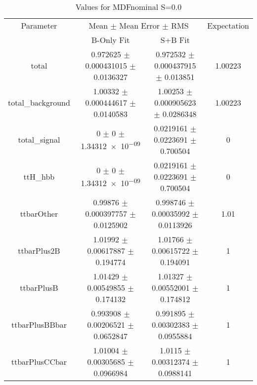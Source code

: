 \begin{table}
\centering
\caption{Values for MDFnominal S=0.0}
\begin{tabular}{cccc}
\toprule
Parameter & \multicolumn{2}{c}{Mean $\pm$ Mean Error $\pm$ RMS} & Expectation\\
 & B-Only Fit & S+B Fit & \\
\midrule
total & \num{0.972625} $\pm$ \num{0.000431015} $\pm$ \num{0.0136327} & \num{0.972532} $\pm$ \num{0.000437915} $\pm$ \num{0.013851} & \num{1.00223}\\
total\_background & \num{1.00332} $\pm$ \num{0.000444617} $\pm$ \num{0.0140583} & \num{1.00253} $\pm$ \num{0.000905623} $\pm$ \num{0.0286348} & \num{1.00223}\\
total\_signal & \num{0} $\pm$ \num{0} $\pm$ \num{1.34312e-09} & \num{0.0219161} $\pm$ \num{0.0223691} $\pm$ \num{0.700504} & \num{0}\\
ttH\_hbb & \num{0} $\pm$ \num{0} $\pm$ \num{1.34312e-09} & \num{0.0219161} $\pm$ \num{0.0223691} $\pm$ \num{0.700504} & \num{0}\\
ttbarOther & \num{0.99876} $\pm$ \num{0.000397757} $\pm$ \num{0.0125902} & \num{0.998746} $\pm$ \num{0.00035992} $\pm$ \num{0.0113926} & \num{1.01}\\
ttbarPlus2B & \num{1.01992} $\pm$ \num{0.00617887} $\pm$ \num{0.194774} & \num{1.01766} $\pm$ \num{0.00615722} $\pm$ \num{0.194091} & \num{1}\\
ttbarPlusB & \num{1.01429} $\pm$ \num{0.00549855} $\pm$ \num{0.174132} & \num{1.01327} $\pm$ \num{0.00552001} $\pm$ \num{0.174812} & \num{1}\\
ttbarPlusBBbar & \num{0.993908} $\pm$ \num{0.00206521} $\pm$ \num{0.0652847} & \num{0.991895} $\pm$ \num{0.00302383} $\pm$ \num{0.0955884} & \num{1}\\
ttbarPlusCCbar & \num{1.01004} $\pm$ \num{0.00305685} $\pm$ \num{0.0966984} & \num{1.0115} $\pm$ \num{0.00312374} $\pm$ \num{0.0988141} & \num{1}\\
\bottomrule
\end{tabular}
\end{table}